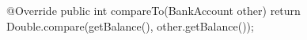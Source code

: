 \begin{unipdcode}[language=Java]
@Override
public int compareTo(BankAccount other) {
    return Double.compare(getBalance(), other.getBalance());
}
\end{unipdcode}

